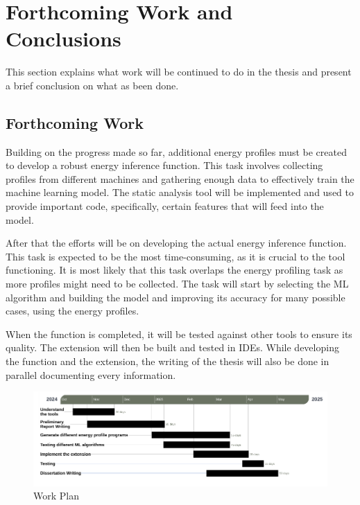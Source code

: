 \documentclass[sigplan]{acmart}
\begin{document}
\section{Forthcoming Work and Conclusions} \label{sec:forthcoming_work_and_conclusions}

This section explains what work will be continued to do in the thesis and present a brief conclusion on what as been done.

\subsection{Forthcoming Work}

Building on the progress made so far, additional energy profiles must be created to develop a robust energy inference function. This task involves collecting profiles from different machines and gathering enough data to effectively train the machine learning model. The static analysis tool will be implemented and used to provide important code, specifically, certain features that will feed into the model.

After that the efforts will be on developing the actual energy inference function. This task is expected to be the most time-consuming, as it is crucial to the tool functioning. It is most likely that this task overlaps the energy profiling task as more profiles might need to be collected. The task will start by selecting the ML algorithm and building the model and improving its accuracy for many possible cases, using the energy profiles.

When the function is completed, it will be tested against other tools to ensure its quality. The extension will then be built and tested in IDEs.
While developing the function and the extension, the writing of the thesis will also be done in parallel documenting every information.

\begin{figure}%
  \centering
  \includegraphics[width = 1 \textwidth]{figures/gantt_diagram.pdf}
  \caption{Work Plan}
  \label{fig:gantt_diagram}
\end{figure}
\end{document}
